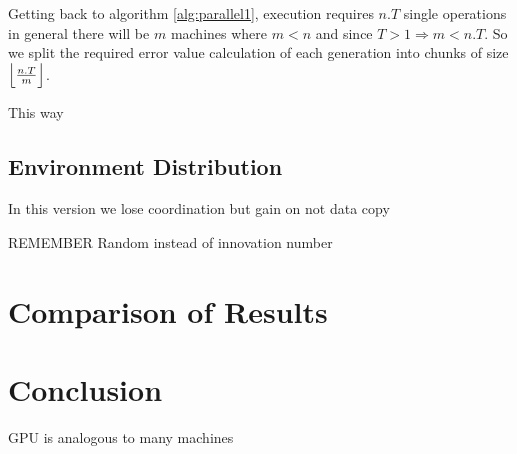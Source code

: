 \documentclass[twocolumn]{article}
\begin{document}
Getting back to algorithm \ref{alg:parallel1}, execution requires $n.T$ single operations in general there will be $m$ machines where $m<n$ and since $T>1 \Rightarrow m<n.T$. So we split the required error value calculation of each generation into chunks of size $\Bigl\lfloor \frac{n.T}{m} \Bigr\rfloor$.

This way 

\subsection{Environment Distribution}
In this version we lose coordination but gain on not data copy

REMEMBER
Random instead of innovation number


\section{Comparison of Results}


\section{Conclusion}

GPU is analogous to many machines




\end{document}
